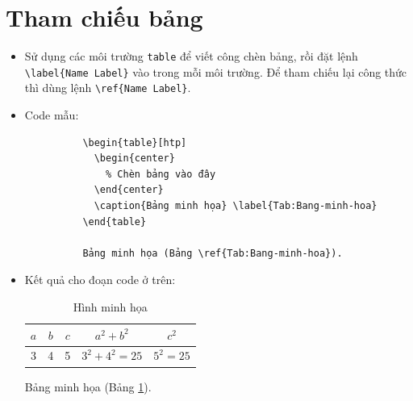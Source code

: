 \documentclass[12pt,a4paper]{article}
\begin{document}
  \section{Tham chiếu bảng}
    \begin{itemize}
      \item Sử dụng các môi trường \verb|table| để viết công chèn bảng, rồi đặt lệnh \verb|\label{Name Label}| vào trong mỗi môi trường. Để tham chiếu lại công thức thì dùng lệnh \verb|\ref{Name Label}|.
      \item Code mẫu:
        \begin{verbatim}
          \begin{table}[htp]
            \begin{center}
              % Chèn bảng vào đây
            \end{center}
            \caption{Bảng minh họa} \label{Tab:Bang-minh-hoa}
          \end{table}
    
          Bảng minh họa (Bảng \ref{Tab:Bang-minh-hoa}).
        \end{verbatim}
      \item Kết quả cho đoạn code ở trên:
        
      \begin{table}[!htp]
        \caption{Hình minh họa} \label{Tab:Bang-minh-hoa}
        \begin{center}
          {
            \renewcommand{\arraystretch}{1.3}
            \begin{tabular}{|c|c|c|c|c|} \hline
              \(a\) & \(b\) & \(c\) & \(a^2 + b^2\) & \(c^2\) \\ \hline
              3 & 4 & 5 & \(3^2 + 4^2 = 25\) & \(5^2 = 25\) \\ \hline
            \end{tabular}
          }
        \end{center}
      \end{table}

      Bảng minh họa (Bảng \ref{Tab:Bang-minh-hoa}).
    \end{itemize}
\end{document}
